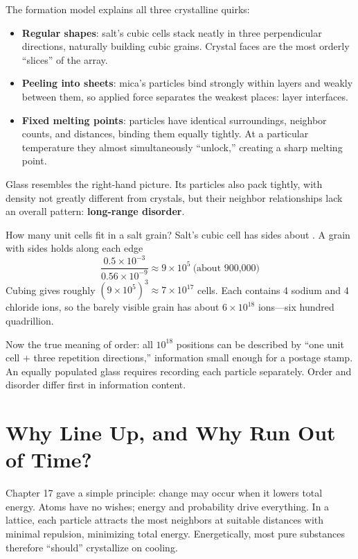 The formation model explains all three crystalline quirks:

\begin{itemize}[itemsep=2pt]
\item \textbf{Regular shapes}: salt's cubic cells stack neatly in three perpendicular directions, naturally building cubic grains. Crystal faces are the most orderly ``slices'' of the array.
\item \textbf{Peeling into sheets}: mica's particles bind strongly within layers and weakly between them, so applied force separates the weakest places: layer interfaces.
\item \textbf{Fixed melting points}: particles have identical surroundings, neighbor counts, and distances, binding them equally tightly. At a particular temperature they almost simultaneously ``unlock,'' creating a sharp melting point.
\end{itemize}

Glass resembles the right-hand picture. Its particles also pack tightly, with density not greatly different from crystals, but their neighbor relationships lack an overall pattern: \textbf{long-range disorder}.

\begin{qiaoliang}
How many unit cells fit in a salt grain? Salt's cubic cell has sides about . A grain with  sides holds along each edge
\[
\frac{0.5\times 10^{-3}}{0.56\times 10^{-9}} \approx 9\times 10^{5}\ \text{(about 900,000)}
\]
Cubing gives roughly $(9\times 10^{5})^{3} \approx 7\times 10^{17}$ cells. Each contains 4 sodium and 4 chloride ions, so the barely visible grain has about $6\times 10^{18}$ ions---six hundred quadrillion.

Now the true meaning of order: all $10^{18}$ positions can be described by ``one unit cell $+$ three repetition directions,'' information small enough for a postage stamp. An equally populated glass requires recording each particle separately. Order and disorder differ first in information content.
\end{qiaoliang}

\section{Why Line Up, and Why Run Out of Time?}

Chapter 17 gave a simple principle: change may occur when it lowers total energy. Atoms have no wishes; energy and probability drive everything. In a lattice, each particle attracts the most neighbors at suitable distances with minimal repulsion, minimizing total energy. Energetically, most pure substances therefore ``should'' crystallize on cooling.

